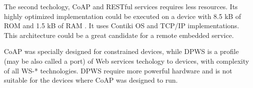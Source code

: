 The second techology, CoAP and RESTful services requires less resources. Its
highly optimized implementation could be executed on a device with 8.5 kB of ROM
and 1.5 kB of RAM \cite{6076698}. It uses Contiki OS and TCP/IP
implementations. This architecture could be a great candidate for  a remote
embedded service.

CoAP was specially designed for constrained devices, while DPWS is a profile
(may be also called a port) of Web services techology to devices, with
complexity of all WS-* technologies. DPWS require more powerful hardware and is
not suitable for the devices where CoAP was designed to run.
